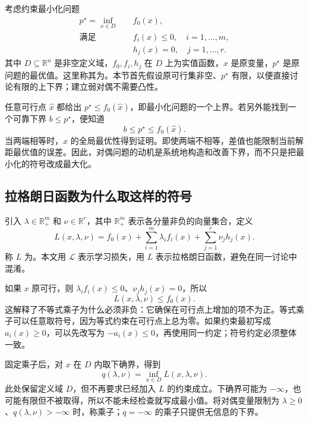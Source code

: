 \documentclass[UTF8]{ctexart}
\begin{document}
考虑约束最小化问题
\begin{equation}
 \begin{aligned}
 p^\star=\inf_{x\in D}\quad & f_0(x),\\
 \text{满足}\quad & f_i(x)\leq0,\quad i=1,\ldots,m,\\
 &h_j(x)=0,\quad j=1,\ldots,r.
 \end{aligned}
 \label{eq:duality-primal}
\end{equation}
其中 $D\subseteq\mathbb R^n$ 是非空定义域，$f_0,f_i,h_j$ 在 $D$ 上为实值函数，$x$ 是原变量，$p^\star$ 是原问题的最优值。这里称其为。本节首先假设原可行集非空、$p^\star$ 有限，以便直接讨论有限的上下界；建立弱对偶不需要凸性。

任意可行点 $\widehat x$ 都给出 $p^\star\leq f_0(\widehat x)$，即最小化问题的一个上界。若另外能找到一个可靠下界 $b\leq p^\star$，便知道
\[
 b\leq p^\star\leq f_0(\widehat x).
\]
当两端相等时，$\widehat x$ 的全局最优性得到证明。即使两端不相等，差值也能限制当前解距最优值的误差。因此，对偶问题的动机是系统地构造和改善下界，而不只是把最小化的符号改成最大化。

\subsection{拉格朗日函数为什么取这样的符号}

引入 $\lambda\in\mathbb R_+^m$ 和 $\nu\in\mathbb R^r$，其中 $\mathbb R_+^m$ 表示各分量非负的向量集合，定义
\begin{equation}
 L(x,\lambda,\nu)
 =f_0(x)+\sum_{i=1}^m\lambda_i f_i(x)
       +\sum_{j=1}^r\nu_jh_j(x).
 \label{eq:duality-lagrangian}
\end{equation}
称 $L$ 为。本文用 $\mathcal L$ 表示学习损失，用 $L$ 表示拉格朗日函数，避免在同一讨论中混淆。

如果 $x$ 原可行，则 $\lambda_i f_i(x)\leq0$、$\nu_jh_j(x)=0$，所以
\begin{equation}
 L(x,\lambda,\nu)\leq f_0(x).
 \label{eq:duality-feasible-lagrangian}
\end{equation}
这解释了不等式乘子为什么必须非负：它确保在可行点上增加的项不为正。等式乘子可以任意取符号，因为等式约束在可行点上总为零。如果约束最初写成 $a_i(x)\geq0$，可以先改写为 $-a_i(x)\leq0$，再使用同一约定；符号约定必须整体一致。

固定乘子后，对 $x$ 在 $D$ 内取下确界，得到
\begin{equation}
 q(\lambda,\nu)=\inf_{x\in D}L(x,\lambda,\nu).
 \label{eq:duality-function}
\end{equation}
此处保留定义域 $D$，但不再要求已经加入 $L$ 的约束成立。下确界可能为 $-\infty$，也可能有限但不被取得，所以不能未经检查就写成最小值。将对偶变量限制为 $\lambda\geq0$、$q(\lambda,\nu)>-\infty$ 时，称乘子；$q=-\infty$ 的乘子只提供无信息的下界。
\end{document}
